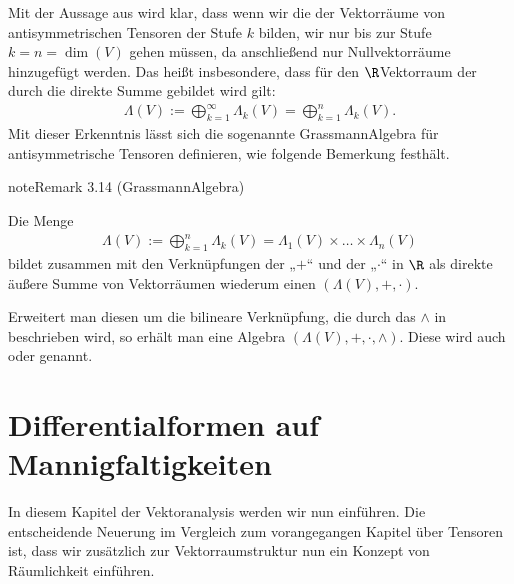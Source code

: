 \documentclass[letterpaper,10pt,german]{jupyterBook}
\begin{document}
\sphinxAtStartPar
Mit der Aussage aus {\hyperref[\detokenize{vektoranalysis/tensor:lem:tensorStufe}]{}} wird klar, dass wenn wir die  der Vektorräume von antisymmetrischen Tensoren der Stufe \(k\) bilden, wir nur bis zur Stufe \(k = n = \operatorname{dim}(V)\) gehen müssen, da anschließend nur Nullvektorräume hinzugefügt werden.
Das heißt insbesondere, dass für den \(\R\)\sphinxhyphen{}Vektorraum der durch die direkte Summe gebildet wird gilt:
\begin{equation*}
\begin{split}\Lambda(V) := \bigoplus_{k=1}^\infty \Lambda_k(V) = \bigoplus_{k=1}^n \Lambda_k(V).\end{split}
\end{equation*}
\sphinxAtStartPar
Mit dieser Erkenntnis lässt sich die sogenannte Grassmann\sphinxhyphen{}Algebra für antisymmetrische Tensoren definieren, wie folgende Bemerkung festhält.
\label{vektoranalysis/tensor:remark-39}
\begin{sphinxadmonition}{note}{Remark 3.14 (Grassmann\sphinxhyphen{}Algebra)}



\sphinxAtStartPar
Die Menge
\begin{equation*}
\begin{split}\Lambda(V) := \bigoplus_{k=1}^n \Lambda_k(V) = \Lambda_1(V) \times \ldots \times \Lambda_n(V)\end{split}
\end{equation*}
\sphinxAtStartPar
bildet zusammen mit den Verknüpfungen der  „\(+\)“ und der  „\(\cdot\)“ in \(\R\) als direkte äußere Summe von Vektorräumen wiederum einen  \((\Lambda(V), +, \cdot)\).

\sphinxAtStartPar
Erweitert man diesen um die bilineare Verknüpfung, die durch das  \(\wedge\) in {\hyperref[\detokenize{vektoranalysis/tensor:def:aeusseresProdukt}]{}} beschrieben wird, so erhält man eine Algebra \((\Lambda(V), +, \cdot, \wedge)\).
Diese wird auch  oder  genannt.
\end{sphinxadmonition}


\chapter{Differentialformen auf Mannigfaltigkeiten}
\label{\detokenize{manifolds/manifolds:differentialformen-auf-mannigfaltigkeiten}}\label{\detokenize{manifolds/manifolds::doc}}
\sphinxAtStartPar
In diesem Kapitel der Vektoranalysis werden wir nun  einführen.
Die entscheidende Neuerung im Vergleich zum vorangegangen Kapitel über Tensoren ist, dass wir zusätzlich zur Vektorraumstruktur nun ein Konzept von Räumlichkeit einführen.
\end{document}
